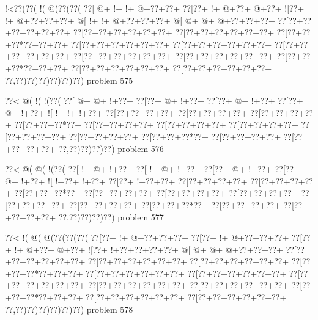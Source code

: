 \vbox{\vbox{\goo
\- !<\0??(\0??(\- !(\- @(\0??(\0??(
\0??[\- @+\- !+\- !+\- @+\0??+\0??+
\0??[\0??+\- !+\- @+\0??+\- @+\0??+
\- ![\0??+\- !+\- @+\0??+\0??+\0??+
\- @[\- !+\- !+\- @+\0??+\0??+\0??+
\- @[\- @+\- @+\- @+\0??+\0??+\0??+
\0??[\0??+\0??+\0??+\0??+\0??+\0??+
\0??[\0??+\0??+\0??+\0??+\0??+\0??+
\0??[\0??+\0??+\0??+\0??+\0??+\0??+
\0??[\0??+\0??+\0??*\0??+\0??+\0??+
\0??[\0??+\0??+\0??+\0??+\0??+\0??+
\0??[\0??+\0??+\0??+\0??+\0??+\0??+
\0??[\0??+\0??+\0??+\0??+\0??+\0??+
\0??[\0??+\0??+\0??+\0??+\0??+\0??+
\0??[\0??+\0??+\0??+\0??+\0??+\0??+
\0??[\0??+\0??+\0??*\0??+\0??+\0??+
\0??[\0??+\0??+\0??+\0??+\0??+\0??+
\0??[\0??+\0??+\0??+\0??+\0??+\0??+
\0??,\0??)\0??)\0??)\0??)\0??)\0??)
}
\hfil problem 575\hfil\break
}

\vbox{\vbox{\goo
\0??<\- @(\- !(\- !(\0??(
\0??[\- @+\- @+\- !+\0??+
\0??[\0??+\- @+\- !+\0??+
\0??[\0??+\- @+\- !+\0??+
\0??[\0??+\- @+\- !+\0??+
\- ![\- !+\- !+\- !+\0??+
\0??[\0??+\0??+\0??+\0??+
\0??[\0??+\0??+\0??+\0??+
\0??[\0??+\0??+\0??+\0??+
\0??[\0??+\0??+\0??*\0??+
\0??[\0??+\0??+\0??+\0??+
\0??[\0??+\0??+\0??+\0??+
\0??[\0??+\0??+\0??+\0??+
\0??[\0??+\0??+\0??+\0??+
\0??[\0??+\0??+\0??+\0??+
\0??[\0??+\0??+\0??*\0??+
\0??[\0??+\0??+\0??+\0??+
\0??[\0??+\0??+\0??+\0??+
\0??,\0??)\0??)\0??)\0??)
}
\hfil problem 576\hfil\break
}

\vbox{\vbox{\goo
\0??<\- @(\- @(\- !(\0??(
\0??[\- !+\- @+\- !+\0??+
\0??[\- !+\- @+\- !+\0??+
\0??[\0??+\- @+\- !+\0??+
\0??[\0??+\- @+\- !+\0??+
\- ![\- !+\0??+\- !+\0??+
\0??[\0??+\- !+\0??+\0??+
\0??[\0??+\0??+\0??+\0??+
\0??[\0??+\0??+\0??+\0??+
\0??[\0??+\0??+\0??*\0??+
\0??[\0??+\0??+\0??+\0??+
\0??[\0??+\0??+\0??+\0??+
\0??[\0??+\0??+\0??+\0??+
\0??[\0??+\0??+\0??+\0??+
\0??[\0??+\0??+\0??+\0??+
\0??[\0??+\0??+\0??*\0??+
\0??[\0??+\0??+\0??+\0??+
\0??[\0??+\0??+\0??+\0??+
\0??,\0??)\0??)\0??)\0??)
}
\hfil problem 577\hfil\break
}

\vbox{\vbox{\goo
\0??<\- !(\- @(\- @(\0??(\0??(\0??(
\0??[\0??+\- !+\- @+\0??+\0??+\0??+
\0??[\0??+\- !+\- @+\0??+\0??+\0??+
\0??[\0??+\- !+\- @+\0??+\- @+\0??+
\- ![\0??+\- !+\0??+\0??+\0??+\0??+
\- @[\- @+\- @+\- @+\0??+\0??+\0??+
\0??[\0??+\0??+\0??+\0??+\0??+\0??+
\0??[\0??+\0??+\0??+\0??+\0??+\0??+
\0??[\0??+\0??+\0??+\0??+\0??+\0??+
\0??[\0??+\0??+\0??*\0??+\0??+\0??+
\0??[\0??+\0??+\0??+\0??+\0??+\0??+
\0??[\0??+\0??+\0??+\0??+\0??+\0??+
\0??[\0??+\0??+\0??+\0??+\0??+\0??+
\0??[\0??+\0??+\0??+\0??+\0??+\0??+
\0??[\0??+\0??+\0??+\0??+\0??+\0??+
\0??[\0??+\0??+\0??*\0??+\0??+\0??+
\0??[\0??+\0??+\0??+\0??+\0??+\0??+
\0??[\0??+\0??+\0??+\0??+\0??+\0??+
\0??,\0??)\0??)\0??)\0??)\0??)\0??)
}
\hfil problem 578\hfil\break
}

